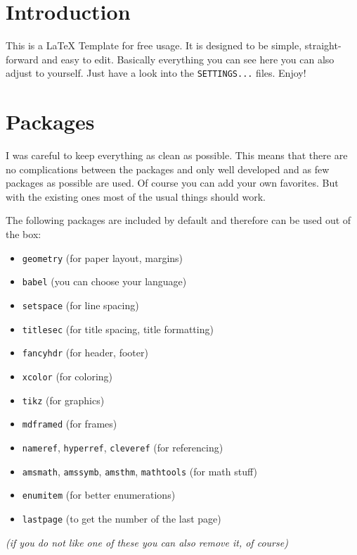 \documentclass[11pt, a4paper]{article}
\begin{document}
\section{Introduction}

This is a \LaTeX{} Template for free usage. It is designed to be simple, straight-forward and easy to edit.
Basically everything you can see here you can also adjust to yourself. Just have a look into the \texttt{SETTINGS...} files. Enjoy!

\section{Packages}

I was careful to keep everything as clean as possible. This means that there are no complications between the packages and only well developed and as few packages as possible are used. Of course you can add your own favorites. But with the existing ones most of the usual things should work.

The following packages are included by default and therefore can be used out of the box:

\begin{itemize}[noitemsep]
  \item \texttt{geometry} (for paper layout, margins)
  \item \texttt{babel} (you can choose your language)
  \item \texttt{setspace} (for line spacing)
  \item \texttt{titlesec} (for title spacing, title formatting)
  \item \texttt{fancyhdr} (for header, footer)
  \item \texttt{xcolor} (for coloring)
  \item \texttt{tikz} (for graphics)
  \item \texttt{mdframed} (for frames)
  \item \texttt{nameref}, \texttt{hyperref}, \texttt{cleveref} (for referencing)
  \item \texttt{amsmath}, \texttt{amssymb}, \texttt{amsthm}, \texttt{mathtools} (for math stuff)
  \item \texttt{enumitem} (for better enumerations)
  \item \texttt{lastpage} (to get the number of the last page)
\end{itemize}

\textsl{(if you do not like one of these you can also remove it, of course)}
\end{document}
